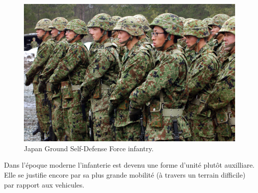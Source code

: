 \documentclass{article}
\begin{document}
\begin{center}
\begin{figure}[H]
\begin{minipage}[H]{0.3\linewidth}
\end{minipage}
\hfill
\begin{minipage}[H]{0.6\linewidth}
	\centering
	\includegraphics[width=\linewidth]{../ressources/JGDSF_Soldiers}
	\caption{Japan Ground Self-Defense Force infantry. \cite{infantery}}
\end{minipage}
\hfill
\end{figure}
\end{center}

Dans l'époque moderne l'infanterie est devenu une forme d'unité plutôt auxilliare. Elle se justifie encore par sa plus grande mobilité (à travers un terrain difficile) par rapport aux vehicules.
\end{document}
